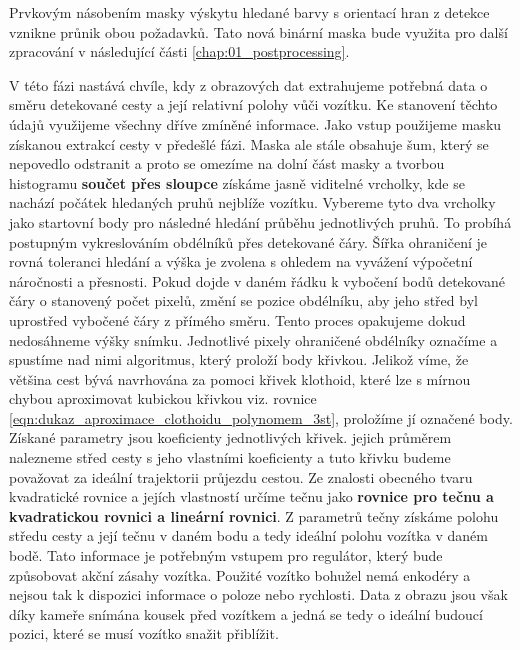 \documentclass[czech, bc, kky, he, iso690numb]{fasthesis}
\begin{document}
            	Prvkovým násobením masky výskytu hledané barvy s orientací hran z detekce vznikne průnik obou požadavků. Tato nová binární maska bude využita pro další zpracování v následující části \ref{chap:01_postprocessing}.
            	
            	
                V této fázi nastává chvíle, kdy z obrazových dat extrahujeme potřebná data o směru detekované cesty a její relativní polohy vůči vozítku. Ke stanovení těchto údajů využijeme všechny dříve zmíněné informace. Jako vstup použijeme masku získanou extrakcí cesty v předešlé fázi. Maska ale stále obsahuje šum, který se nepovedlo odstranit a proto se omezíme na dolní část masky a tvorbou histogramu \textbf{součet přes sloupce} získáme jasně viditelné vrcholky, kde se nachází počátek hledaných pruhů nejblíže vozítku. Vybereme tyto dva vrcholky jako startovní body pro následné hledání průběhu jednotlivých pruhů. To probíhá postupným vykreslováním obdélníků přes detekované čáry. Šířka ohraničení je rovná toleranci hledání a výška je zvolena s ohledem na vyvážení výpočetní náročnosti a přesnosti. Pokud dojde v daném řádku k vybočení bodů detekované čáry o stanovený počet pixelů, změní se pozice obdélníku, aby jeho střed byl uprostřed vybočené čáry z přímého směru. Tento proces opakujeme dokud nedosáhneme výšky snímku. Jednotlivé pixely ohraničené obdélníky označíme a spustíme nad nimi algoritmus, který proloží body křivkou. Jelikož víme, že většina cest bývá navrhována za pomoci křivek klothoid, které lze s mírnou chybou aproximovat kubickou křivkou viz. rovnice \ref{eqn:dukaz_aproximace_clothoidu_polynomem_3st}, proložíme jí označené body. Získané parametry jsou koeficienty jednotlivých křivek. jejich průměrem nalezneme střed cesty s jeho vlastními koeficienty a tuto křivku budeme považovat za ideální trajektorii průjezdu cestou. Ze znalosti obecného tvaru kvadratické rovnice a jejích vlastností určíme tečnu jako \textbf{rovnice pro tečnu a kvadratickou rovnici a lineární rovnici}. Z parametrů tečny získáme polohu středu cesty a její tečnu v daném bodu a tedy ideální polohu vozítka v daném bodě. Tato informace je potřebným vstupem pro regulátor, který bude způsobovat akční zásahy vozítka. Použité vozítko bohužel nemá enkodéry a nejsou tak k dispozici informace o poloze nebo rychlosti. Data z obrazu jsou však díky kameře snímána kousek před vozítkem a jedná se tedy o ideální budoucí pozici, které se musí vozítko snažit přiblížit.
\end{document}
